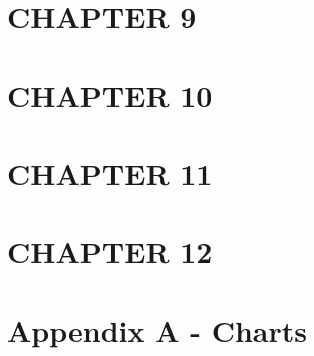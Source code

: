 \chapter{CHAPTER 9}


\chapter{CHAPTER 10}


\chapter{CHAPTER 11}


\chapter{CHAPTER 12}


\chapter{Appendix A - Charts}



